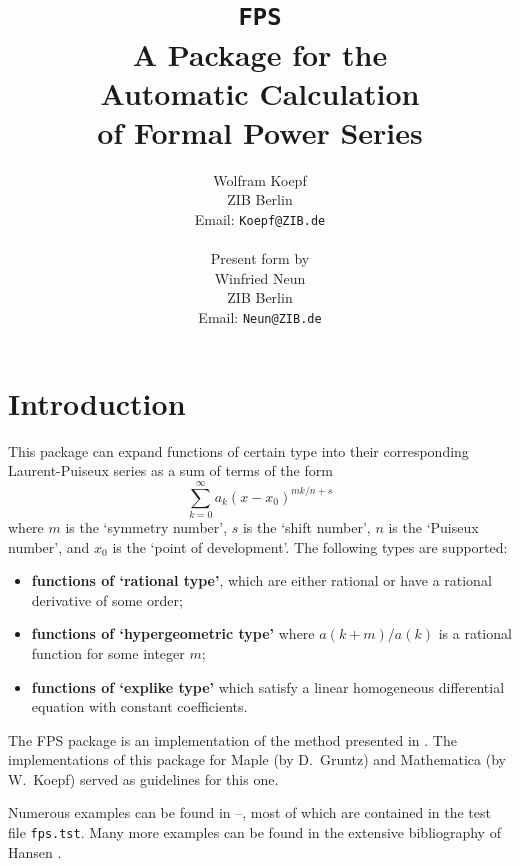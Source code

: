 \title{{\tt FPS}\\ 
A Package for the\\
Automatic Calculation \\
of Formal Power Series}
\date{}
\author{Wolfram Koepf\\
	ZIB Berlin \\
	Email: {\tt  Koepf@ZIB.de}
\\
\\
	Present \REDUCE{} form by \\
	Winfried Neun \\
	ZIB Berlin \\
        Email: {\tt Neun@ZIB.de}}

\maketitle

\section{Introduction}
This package can expand functions of certain type into
their corresponding Laurent-Puiseux series as a sum of terms of the form
\begin{displaymath}
\sum_{k=0}^{\infty} a_{k} (x-x_{0})^{m k/n + s}
\end{displaymath}
where $m$ is the `symmetry number', $s$ is the `shift number',
$n$ is the `Puiseux number',
and $x_0$ is the `point of development'. The following types are
supported:
\begin{itemize}
\item
{\bf functions of `rational type'}, which are either rational or have a
rational derivative of some order;
\item
{\bf functions of `hypergeometric type'} where $a(k+m)/a(k)$ is a rational
function for some integer $m$;
\item
{\bf functions of `explike type'} which satisfy a linear homogeneous
differential equation with constant coefficients.
\end{itemize}

The FPS package is an implementation of the method
presented in \cite{Koepf:92}. The implementations of this package
for {\sc Maple} (by D.\ Gruntz) and {\sc Mathematica} (by W.\ Koepf)
served as guidelines for this one.

Numerous examples can be found in \cite{Koepf:93a}--\cite{Koepf:93b}, 
most of which are contained in the test file {\tt fps.tst}. Many 
more examples can be found in the extensive bibliography of Hansen \cite{Han}.


